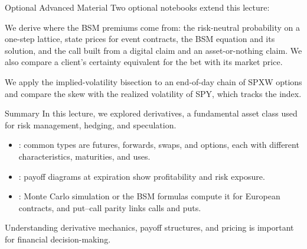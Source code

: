 \documentclass[aspectratio=169,11pt]{beamer}
\newcommand{\advrepo}{https://github.com/varnerlab/CHEME-5660-CourseRepository-Fall-2026/blob/main/lectures/week-9/L9b/advanced}
\begin{document}
\begin{frame}{Optional Advanced Material}
  Two optional notebooks extend this lecture:

  \vspace{0.4em}
  {\normalsize\textbf{} \par
  \href{\advrepo/contingent_claims/CHEME-5660-L9b-Advanced-ContingentClaims-BSM-Fall-2026.ipynb}{}}

  \vspace{0.4em}
  We derive where the BSM premiums come from: the risk-neutral probability on a
  one-step lattice, state prices for event contracts, the BSM equation and its
  solution, and the call built from a digital claim and an asset-or-nothing
  claim. We also compare a client's certainty equivalent for the bet with its
  market price.

  \vspace{0.5em}
  {\normalsize\textbf{} \par
  \href{\advrepo/spxw_volatility_skew/CHEME-5660-L9b-Advanced-SPXW-Volatility-Skew-Fall-2026.ipynb}{}}

  \vspace{0.4em}
  We apply the implied-volatility bisection to an end-of-day chain of SPXW options
  and compare the skew with the realized volatility of SPY, which tracks the index.
\end{frame}

\begin{frame}{Summary}
  In this lecture, we explored derivatives, a fundamental asset class used for
  risk management, hedging, and speculation.

  \vspace{0.5em}
  {\large\textbf{}}
  \begin{itemize}\setlength{\itemsep}{0.3em}
    \item {}:
      common types are futures, forwards, swaps, and options, each with
      different characteristics, maturities, and uses.
    \item {}: payoff diagrams at expiration show profitability and risk
      exposure.
    \item {}: Monte Carlo simulation or the BSM formulas
      compute it for European contracts, and put--call parity links calls and
      puts.
  \end{itemize}
  \vspace{0.3em}
  Understanding derivative mechanics, payoff structures, and pricing is
  important for financial decision-making.
\end{frame}
\end{document}
